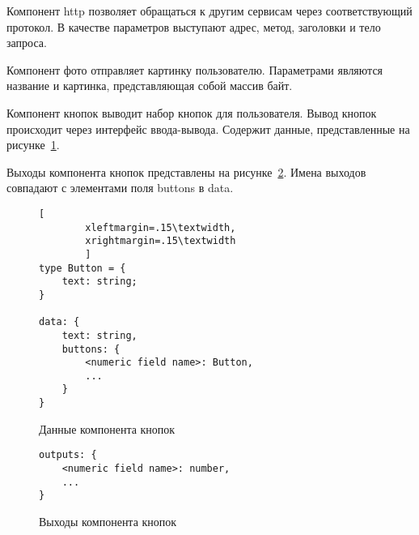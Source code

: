 Компонент http позволяет обращаться к другим сервисам через соответствующий протокол.
В качестве параметров выступают адрес, метод, заголовки и тело запроса.

Компонент фото отправляет картинку пользователю. Параметрами являются название и картинка,
представляющая собой массив байт.

Компонент кнопок выводит набор кнопок для пользователя. Вывод
кнопок происходит через интерфейс ввода-вывода.
Содержит данные, представленные на рисунке~\ref{f:button-component-data}.

Выходы компонента кнопок представлены на рисунке~\ref{f:button-component-outputs}.
Имена выходов совпадают с элементами поля buttons в data.

\begin{figure}[ht]
	\centering
	\vspace{\toppaddingoffigure}
	\begin{lstlisting}[
        xleftmargin=.15\textwidth,
        xrightmargin=.15\textwidth
        ]
type Button = {
    text: string;
}

data: {
    text: string,
    buttons: {
        <numeric field name>: Button,
        ...
    }
}
    \end{lstlisting}
	\caption{Данные компонента кнопок}
	\label{f:button-component-data}
\end{figure}

\begin{figure}[!ht]
	\centering
	\vspace{\toppaddingoffigure}
	\begin{lstlisting}
outputs: {
    <numeric field name>: number,
    ...
}
    \end{lstlisting}
	\caption{Выходы компонента кнопок}
	\label{f:button-component-outputs}
\end{figure}

\newpage


